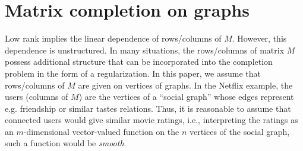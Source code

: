 \documentclass{article}
\begin{document}
%














\vspace{-0.1cm}
\section{Matrix completion on graphs}
\label{secMatComOnGrap}
\vspace{-0.2cm}

Low rank implies the linear dependence of rows/columns of $M$. However, this dependence is unstructured. In many situations, the rows/columns of matrix $M$ possess additional structure that can be incorporated into the completion problem in the form of a regularization. In this paper, we assume that rows/columns of $M$ are given on vertices of graphs. In the Netflix example, the users (columns of $M$) are the vertices of a ``social graph'' whose edges represent e.g. friendship or similar tastes  relations. Thus, it is reasonable to assume that connected users would give similar movie ratings, i.e., interpreting the ratings as an $m$-dimensional vector-valued function on the $n$ vertices of the social graph, such a function would be {\em smooth}.
\end{document}
